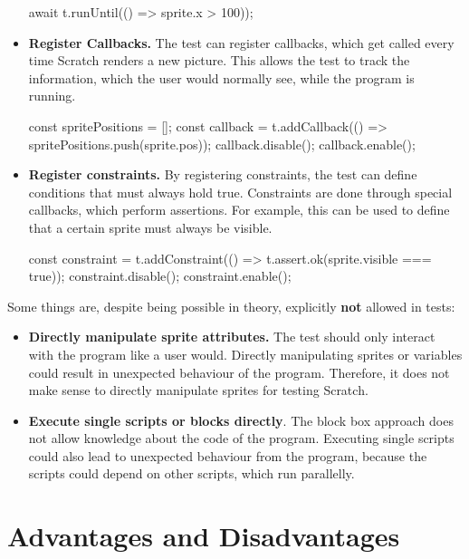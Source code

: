 \begin{itemize}
\begin{javascriptcode}
            await t.runUntil(() => sprite.x > 100));
        \end{javascriptcode}
    \item \textbf{Register Callbacks.}
        The test can register callbacks, which get called every time Scratch renders a new picture.
        This allows the test to track the information, which the user would normally see, while the program is running.
        \begin{javascriptcode}
            const spritePositions = [];
            const callback = t.addCallback(() => spritePositions.push(sprite.pos));
            callback.disable();
            callback.enable();
        \end{javascriptcode}
    \item \textbf{Register constraints.}
        By registering constraints, the test can define conditions that must always hold true.
        Constraints are done through special callbacks, which perform assertions.
        For example, this can be used to define that a certain sprite must always be visible.
        \begin{javascriptcode}
            const constraint = t.addConstraint(() => t.assert.ok(sprite.visible === true));
            constraint.disable();
            constraint.enable();
        \end{javascriptcode}
\end{itemize}

\noindent Some things are, despite being possible in theory, explicitly \textbf{not} allowed in tests:

\begin{itemize}
    \item \textbf{Directly manipulate sprite attributes.}
        The test should only interact with the program like a user would.
        Directly manipulating sprites or variables could result in unexpected behaviour of the program.
        Therefore, it does not make sense to directly manipulate sprites for testing Scratch.
    \item \textbf{Execute single scripts or blocks directly}.
        The block box approach does not allow knowledge about the code of the program.
        Executing single scripts could also lead to unexpected behaviour from the program, because the scripts could depend on other scripts, which run parallelly.
\end{itemize}

\section{Advantages and Disadvantages}

